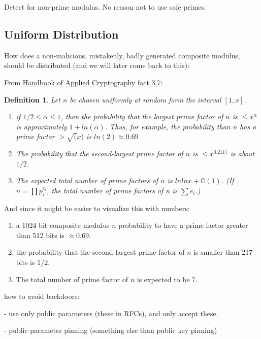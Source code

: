 \documentclass[a4paper,11pt,twocolumn]{article}
\newtheorem{definition}{Definition}
\begin{document}
Detect for non-prime modulus. No reason not to use safe primes.

\subsection{Uniform Distribution}

How does a non-malicious, mistakenly, badly generated composite modulus, should be distributed (and we will later come back to this):

From \href{http://cacr.uwaterloo.ca/hac/about/chap3.pdf}{Handbook of Applied Cryptography fact 3.7}:

\begin{definition}
    Let $n$ be chosen uniformly at random form the interval $[1, x]$.
    \begin{enumerate}
        \item if $1/2 \leq \alpha \leq 1$, then the probability that the largest prime factor of $n$ is $\leq x^{\alpha}$ is approximately $1+ ln(\alpha)$. Thus, for example, the probability than $n$ has a prime factor $> \sqrt(x)$ is $ln(2) \approx 0.69$
        \item The probability that the second-largest prime factor of $n$ is $\leq x^{0.2117}$ is about $1/2$. 
        \item The expected total number of prime factors of $n$ is $ln ln x + \mathbb{O}(1)$. (If $n = \prod p_i^{e_i}$, the total number of prime factors of n is $\sum e_i$.)
    \end{enumerate} 
\end{definition}

And since it might be easier to visualize this with numbers:

\begin{enumerate}
    \item a 1024 bit composite modulus $n$ probability to have a prime factor greater than 512 bits is $\approx 0.69$.
    \item the probability that the second-largest prime factor of $n$ is smaller than 217 bits is $1/2$.
    \item The total number of prime factor of $n$ is expected to be $7$.
\end{enumerate}

how to avoid backdoors:

- use only public parameters (these in RFCs), and only accept these. 

- public parameter pinning (something else than public key pinning)
\end{document}
